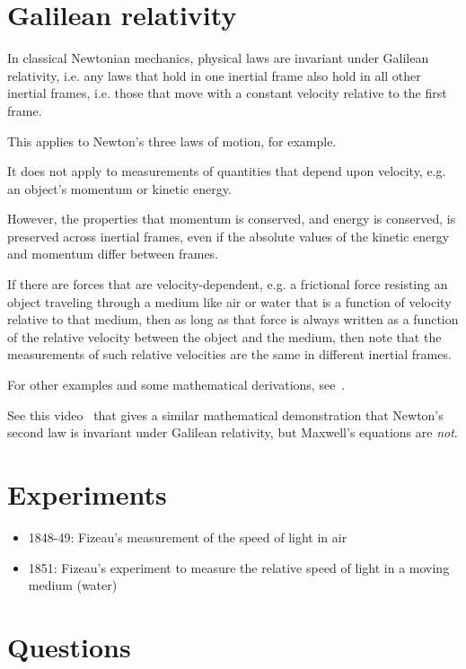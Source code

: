 \documentclass[a4paper]{article}
\theoremstyle{plain}
\theoremstyle{definition}
\begin{document}
\section{Galilean relativity}

In classical Newtonian mechanics, physical laws are invariant under
Galilean relativity, i.e. any laws that hold in one inertial frame
also hold in all other inertial frames, i.e. those that move with a
constant velocity relative to the first frame.

This applies to Newton's three laws of motion, for example.

It does not apply to measurements of quantities that depend upon
velocity, e.g. an object's momentum or kinetic energy.

However, the properties that momentum is conserved, and energy is
conserved, is preserved across inertial frames, even if the absolute
values of the kinetic energy and momentum differ between frames.

If there are forces that are velocity-dependent, e.g. a frictional
force resisting an object traveling through a medium like air or water
that is a function of velocity relative to that medium, then as long
as that force is always written as a function of the relative velocity
between the object and the medium, then note that the measurements of
such relative velocities are the same in different inertial frames.

For other examples and some mathematical derivations,
see~\cite{GalileanTransformation}.

See this video~\cite{GalileanInvarianceMaxwellsEquations} that gives a
similar mathematical demonstration that Newton's second law is
invariant under Galilean relativity, but Maxwell's equations are {\em
  not}.


\section{Experiments}

\begin{itemize}
\item 1848-49: Fizeau's measurement of the speed of light in
  air~\cite{Fizeau1849}
\item 1851: Fizeau's experiment to measure the relative speed of light
  in a moving medium (water)~\cite{Fizeau1851}
\end{itemize}


\section{Questions}
\end{document}

